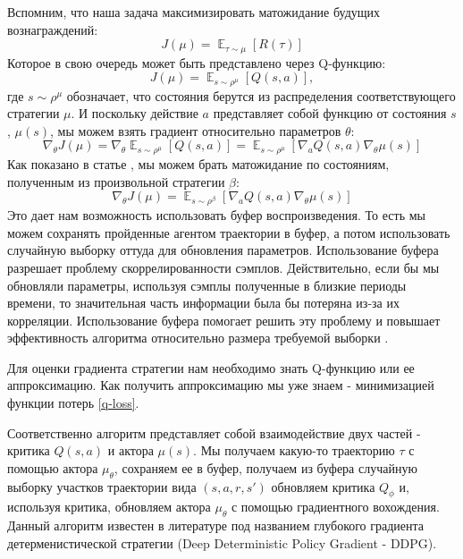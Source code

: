 \documentclass[12pt, a4paper]{extarticle}
\newcommand{\E}{\mathop{\mathbb{E}}}
\theoremstyle{definition}
\begin{document}
Вспомним, что наша задача максимизировать матожидание будущих вознаграждений:
\begin{equation}
    J(\mu)=\E_{\tau \sim \mu}\left[R(\tau)\right]
\end{equation}
Которое в свою очередь может быть представлено через Q-функцию:
\begin{equation}
    J(\mu)=\E_{s \sim \rho^{\mu}}\left[Q(s,a)\right], 
\end{equation}
где $s\sim \rho^{\mu}$ обозначает, что состояния берутся из распределения соответствующего стратегии $\mu$.
И поскольку действие $a$ представляет собой функцию от состояния $s$, $\mu(s)$, мы можем взять градиент относительно параметров $\theta$:
\begin{equation}
    \nabla_{\theta}J(\mu)=\nabla_{\theta}\E_{s \sim \rho^{\mu}}\left[Q(s,a)\right] = \E_{s \sim \rho^{\mu}} \left[\nabla_{a}Q(s,a)\nabla_{\theta}\mu(s) \right]
\end{equation}
Как показано в статье \cite{silver2014deterministic}, мы можем брать матожидание по состояниям, полученным из произвольной стратегии $\beta$:
\begin{equation}
    \nabla_{\theta}J(\mu)= \E_{s \sim \rho^{\beta}} \left[\nabla_{a}Q(s,a)\nabla_{\theta}\mu(s) \right]
\end{equation}
Это дает нам возможность использовать буфер воспроизведения. То есть мы можем сохранять пройденные агентом траектории в буфер, а потом использовать случайную выборку оттуда для обновления параметров. Использование буфера разрешает проблему скоррелированности сэмплов. Действительно, если бы мы обновляли параметры, используя сэмплы полученные в близкие периоды времени, то значительная часть информации была бы потеряна из-за их корреляции. Использование буфера помогает решить эту проблему и повышает эффективность алгоритма относительно размера требуемой выборки \cite{lillicrap2015continuous}.

Для оценки градиента стратегии нам необходимо знать Q-функцию или ее аппроксимацию. Как получить аппроксимацию мы уже знаем - минимизацией функции потерь \ref{q-loss}. 

Соответственно алгоритм представляет собой взаимодействие двух частей - критика $Q(s,a)$ и актора $\mu(s)$. Мы получаем какую-то траекторию $\tau$ с помощью актора $\mu_{\theta}$, сохраняем ее в буфер, получаем из буфера случайную выборку участков траектории вида $(s, a, r, s')$ обновляем критика $Q_{\phi}$ и, используя критика, обновляем актора $\mu_{\theta}$ с помощью градиентного вохождения. Данный алгоритм известен в литературе под названием глубокого градиента детерменистической стратегии (Deep Deterministic Policy Gradient - DDPG). 
\end{document}

